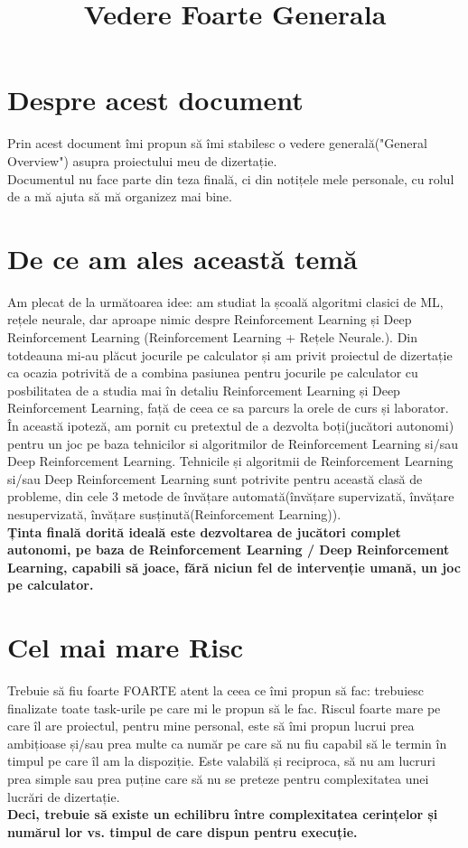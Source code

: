 \documentclass[12pt]{article}
\title{Vedere Foarte Generala}
\begin{document}
\maketitle

\section{Despre acest document}
    Prin acest document îmi propun să îmi stabilesc o vedere generală("General Overview") asupra proiectului meu de dizertație.\\
    Documentul nu face parte din teza finală, ci din notițele mele personale, cu rolul de a mă ajuta să mă organizez mai bine.

\section{De ce am ales această temă}
    Am plecat de la următoarea idee: am studiat la școală algoritmi clasici de ML, rețele neurale, dar aproape nimic despre Reinforcement Learning și Deep Reinforcement Learning (Reinforcement Learning + Rețele Neurale.). Din totdeauna mi-au plăcut jocurile pe calculator și am privit proiectul de dizertație ca ocazia potrivită de a combina pasiunea pentru jocurile pe calculator cu posbilitatea de a studia mai în detaliu Reinforcement Learning și Deep Reinforcement Learning, față de ceea ce sa parcurs la orele de curs și laborator. \\
    În această ipoteză, am pornit cu pretextul de a dezvolta boți(jucători autonomi) pentru un joc pe baza tehnicilor si algoritmilor de Reinforcement Learning si/sau Deep Reinforcement Learning. Tehnicile și algoritmii de Reinforcement Learning si/sau Deep Reinforcement Learning sunt potrivite pentru această clasă de probleme, din cele 3 metode de învățare automată(învățare supervizată, învățare nesupervizată, învățare susținută(Reinforcement Learning)). \\
    \textbf{Ținta finală dorită ideală este dezvoltarea de jucători complet autonomi, pe baza de Reinforcement Learning / Deep Reinforcement Learning, capabili să joace, fără niciun fel de intervenție umană, un joc pe calculator.} \\

\section{Cel mai mare Risc}
    Trebuie să fiu foarte FOARTE atent la ceea ce îmi propun să fac: trebuiesc finalizate toate task-urile pe care mi le propun să le fac. Riscul foarte mare pe care îl are proiectul, pentru mine personal, este să îmi propun lucrui prea ambițioase și/sau prea multe ca număr pe care să nu fiu capabil să le termin în timpul pe care îl am la dispoziție. Este valabilă și reciproca, să nu am lucruri prea simple sau prea puține care să nu se preteze pentru complexitatea unei lucrări de dizertație. \\
    \textbf{Deci, trebuie să existe un echilibru între complexitatea cerințelor și numărul lor vs. timpul de care dispun pentru execuție.}
\end{document}
